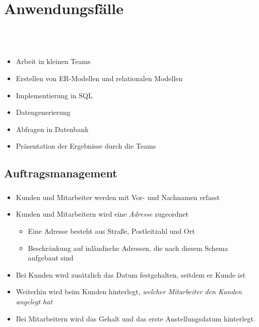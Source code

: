 \section{Anwendungsf\"alle}

\begin{frame}[t]
\frametitle{\insertsection}
\\[4pt]
\\[8pt]
\begin{itemize}
	\item Arbeit in kleinen Teams
	\item Erstellen von ER-Modellen und relationalen Modellen
	\item Implementierung in SQL
	\item Datengenerierung
	\item Abfragen in Datenbank
	\item Pr\"asentation der Ergebnisse durch die Teams
\end{itemize}
\end{frame}

\subsection*{Auftragsmanagement}

\begin{frame}[t]
\frametitle{\insertsection}
\framesubtitle{\insertsubsection}
\begin{itemize}
\item Kunden und Mitarbeiter werden mit Vor- und Nachnamen erfasst 
\item Kunden und Mitarbeitern wird eine \textit{Adresse} zugeordnet
\begin{itemize}
	\item Eine Adresse besteht aus Stra\ss e, Postleitzahl und Ort
	\item Beschr\"ankung auf inl\"andische Adressen, die nach diesem Schema aufgebaut sind
\end{itemize}
\item Bei Kunden wird zus\"atzlich das Datum festgehalten, seitdem er Kunde ist 
\item Weiterhin wird beim Kunden hinterlegt, \textit{welcher Mitarbeiter den Kunden angelegt hat} 
\item Bei Mitarbeitern wird das Gehalt und das erste Anstellungsdatum hinterlegt. 
\end{itemize}
\end{frame}

